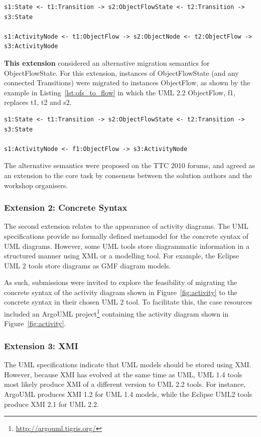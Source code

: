 \begin{lstlisting}[caption=Migrating Actions, label=lst:ofs_to_node]
s1:State <- t1:Transition -> s2:ObjectFlowState <- t2:Transition -> s3:State

s1:ActivityNode <- t1:ObjectFlow -> s2:ObjectNode <- t2:ObjectFlow -> s3:ActivityNode
\end{lstlisting}

\textbf{This extension} considered an alternative migration semantics for ObjectFlowState. For this extension, instances of ObjectFlowState (and any connected Transitions) were migrated to instances ObjectFlow, as shown by the example in Listing~\ref{lst:ofs_to_flow} in which the UML 2.2 ObjectFlow, f1, replaces t1, t2 and s2.

\begin{lstlisting}[caption=Migrating Actions, label=lst:ofs_to_flow]
s1:State <- t1:Transition -> s2:ObjectFlowState <- t2:Transition -> s3:State

s1:ActivityNode <- f1:ObjectFlow -> s3:ActivityNode
\end{lstlisting}

The alternative semantics were proposed on the TTC 2010 forums, and agreed as an extension to the core task by consensus between the solution authors and the workshop organisers. 

\subsubsection{Extension 2: Concrete Syntax}
\label{sub:concrete_syntax}
The second extension relates to the appearance of activity diagrams. The UML specifications provide no formally defined metamodel for the concrete syntax of UML diagrams. However, some UML tools store diagrammatic information in a structured manner using XML or a modelling tool. For example, the Eclipse UML 2 tools \cite{mdt_uml2} store diagrams as GMF \cite{gronback09emp} diagram models.

As such, submissions were invited to explore the feasibility of migrating the concrete syntax of the activity diagram shown in Figure~\ref{fig:activity} to the concrete syntax in their chosen UML 2 tool. To facilitate this, the case resources included an ArgoUML project\footnote{\url{http://argouml.tigris.org/}} containing the activity diagram shown in Figure~\ref{fig:activity}.

\subsubsection{Extension 3: XMI}
\label{sub:xmi}
The UML specifications indicate that UML models should be stored using XMI. However, because XMI has evolved at the same time as UML, UML 1.4 tools most likely produce XMI of a different version to UML 2.2 tools. For instance, ArgoUML produces XMI 1.2 for UML 1.4 models, while the Eclipse UML2 tools produce XMI 2.1 for UML 2.2.

